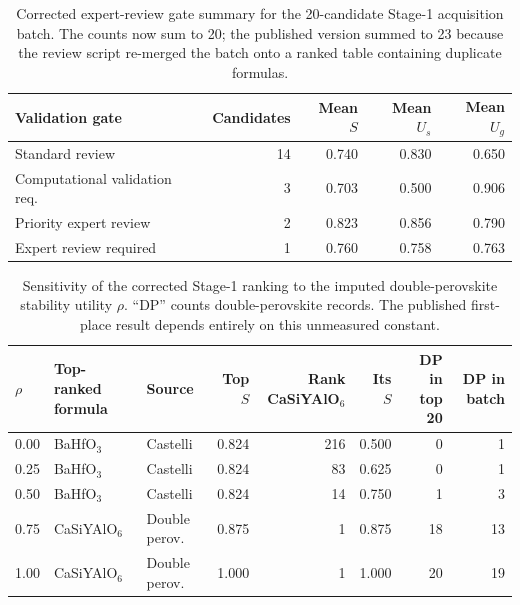\begin{table}[htbp]
\centering
\small
\caption{Corrected expert-review gate summary for the 20-candidate Stage-1 acquisition batch. The counts now sum to 20; the published version summed to 23 because the review script re-merged the batch onto a ranked table containing duplicate formulas.}
\label{tab:a1_corrected_gates}
\begin{tabular}{lrrrr}
\toprule
Validation gate & Candidates & Mean $S$ & Mean $U_s$ & Mean $U_g$ \\
\midrule
Standard review & 14 & 0.740 & 0.830 & 0.650 \\
Computational validation req. & 3 & 0.703 & 0.500 & 0.906 \\
Priority expert review & 2 & 0.823 & 0.856 & 0.790 \\
Expert review required & 1 & 0.760 & 0.758 & 0.763 \\
\bottomrule
\end{tabular}
\end{table}

\begin{table}[htbp]
\centering
\scriptsize
\setlength{\tabcolsep}{3pt}
\caption{Sensitivity of the corrected Stage-1 ranking to the imputed double-perovskite stability utility $\rho$. ``DP'' counts double-perovskite records. The published first-place result depends entirely on this unmeasured constant.}
\label{tab:a1_imputation}
\begin{tabular}{lllrrrrr}
\toprule
$\rho$ & Top-ranked formula & Source & Top $S$ & Rank CaSiYAlO$_6$ & Its $S$ & DP in top 20 & DP in batch \\
\midrule
0.00 & BaHfO$_{3}$ & Castelli & 0.824 & 216 & 0.500 & 0 & 1 \\
0.25 & BaHfO$_{3}$ & Castelli & 0.824 & 83 & 0.625 & 0 & 1 \\
0.50 & BaHfO$_{3}$ & Castelli & 0.824 & 14 & 0.750 & 1 & 3 \\
0.75 & CaSiYAlO$_{6}$ & Double perov. & 0.875 & 1 & 0.875 & 18 & 13 \\
1.00 & CaSiYAlO$_{6}$ & Double perov. & 1.000 & 1 & 1.000 & 20 & 19 \\
\bottomrule
\end{tabular}
\end{table}

